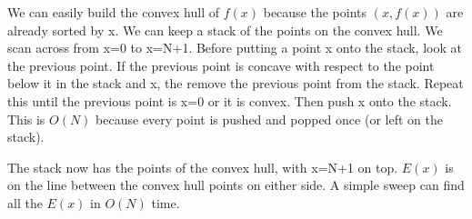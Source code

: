 \documentclass{article}
\begin{document}
    We can easily build the convex hull of $f(x)$ because the points $(x,f(x))$ are already sorted by x. We can keep a stack of the points on the convex hull.  We scan across from x=0 to x=N+1. Before putting a point x onto the stack, look at the previous point.  If the previous point is concave with respect to the point below it in the stack and x, the remove the previous point from the stack.  Repeat this until the previous point is x=0 or it is convex. Then push x onto the stack. This is $O(N)$ because every point is pushed and popped once (or left on the stack).
    
    The stack now has the points of the convex hull, with x=N+1 on top. $E(x)$ is on the line between the convex hull points on either side. A simple sweep can find all the $E(x)$ in $O(N)$ time.
\end{document}
